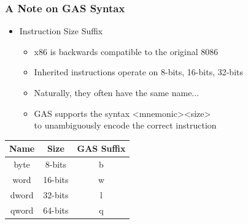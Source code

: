 \documentclass[11pt,xcolor=dvipsnames]{beamer}
\newcommand{\vs}{\vspace{0.5em}}
\begin{document}
\begin{frame}[fragile,t]
\frametitle{A Note on GAS Syntax}
\begin{itemize}
    \item Instruction Size Suffix
    \begin{itemize}
        \item x86 is backwards compatible to the original 8086
        \item Inherited instructions operate on 8-bits, 16-bits, 32-bits
        \item Naturally, they often have the same name...
        \vs
        \pause
        \item GAS supports the syntax {\ttfamily <mnemonic><size>} \\ to unambiguously encode the correct instruction \\
    \end{itemize}
\end{itemize}
\begin{center}
\begin{tabular}{c|c|c}
\textbf{Name} & \textbf{Size} & \textbf{GAS Suffix} \\
\hline \hline
byte & 8-bits & b \\
word & 16-bits & w \\
dword & 32-bits & l \\
qword & 64-bits & q \\
\end{tabular}
\end{center}
\end{frame}
\end{document}

